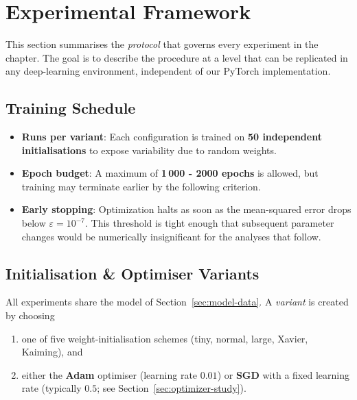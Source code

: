 ﻿%
\section{Experimental Framework}
\label{sec:abs1-framework}

This section summarises the \emph{protocol} that governs every experiment in
the chapter.  The goal is to describe the procedure at a level that can be
replicated in any deep-learning environment, independent of our PyTorch
implementation.

\subsection*{Training Schedule}

\begin{itemize}
  \item \textbf{Runs per variant}: Each configuration is trained
        on \textbf{50 independent initialisations} to expose variability due
        to random weights.
  \item \textbf{Epoch budget}: A maximum of \textbf{1\,000 - 2000 epochs} is allowed, but training may
        terminate earlier by the following criterion.
  \item \textbf{Early stopping}: Optimization halts as soon as the
        mean-squared error drops below
        \(\displaystyle\varepsilon = 10^{-7}\).
        This threshold is tight enough that subsequent parameter changes would
        be numerically insignificant for the analyses that follow.
\end{itemize}

\subsection*{Initialisation \& Optimiser Variants}

All experiments share the model of Section~\ref{sec:model-data}.  
A \emph{variant} is created by choosing

\begin{enumerate}
  \item one of five weight-initialisation schemes  
        (tiny, normal, large, Xavier, Kaiming), and
  \item either the \textbf{Adam} optimiser (learning rate \(0.01\))  
        or \textbf{SGD} with a fixed learning rate (typically \(0.5\); see
        Section~\ref{sec:optimizer-study}).
\end{enumerate}

